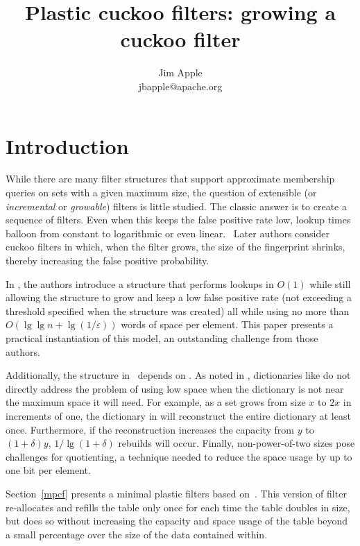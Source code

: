 \documentclass[letterpaper, 11pt]{article}
\begin{document}
\title{Plastic cuckoo filters: growing a cuckoo filter}
\author{Jim Apple \\
  jbapple@apache.org}
\maketitle

\section{Introduction}
While there are many filter structures that support approximate membership queries on sets with a given maximum size, the question of extensible (or {\em incremental} or {\em growable}) filters is little studied.
The classic answer is to create a sequence of filters.
Even when this keeps the false positive rate low, lookup times balloon from constant to logarithmic or even linear.~\cite{psw,logarithm,consistent-cuckoo} %
Later authors consider cuckoo filters in which, when the filter grows, the size of the fingerprint shrinks, thereby increasing the false positive probability.~\cite{logarithm,morton-journal,vacuum,rsqf}

In \cite{psw}, the authors introduce a structure that performs lookups in $O(1)$ while still allowing the structure to grow and keep a low false positive rate (not exceeding a threshold specified when the structure was created) all while using no more than $O(\lg \lg n + \lg (1/\varepsilon))$ words of space per element.
This paper presents a practical instantiation of this model, an outstanding challenge from those authors.

Additionally, the structure in~\cite{psw} depends on \cite{succinct}.
As noted in \cite{dysect}, dictionaries like \cite{succinct} do not directly address the problem of using low space when the dictionary is not near the maximum space it will need.
For example, as a set grows from size $x$ to $2x$ in increments of one, the dictionary in \cite{succinct} will reconstruct the entire dictionary at least once.
Furthermore, if the reconstruction increases the capacity from $y$ to $(1 + \delta)y$, $1/\lg(1+\delta)$ rebuilds will occur.
Finally, non-power-of-two sizes pose challenges for quotienting, a technique needed to reduce the space usage by up to one bit per element.~\cite{change-your-base, cleary-quotient}

Section~\ref{mpcf} presents a minimal plastic filters based on~\cite{dysect}.
This version of filter re-allocates and refills the table only once for each time the table doubles in size, but does so without increasing the capacity and space usage of the table beyond a small percentage over the size of the data contained within.
\end{document}
